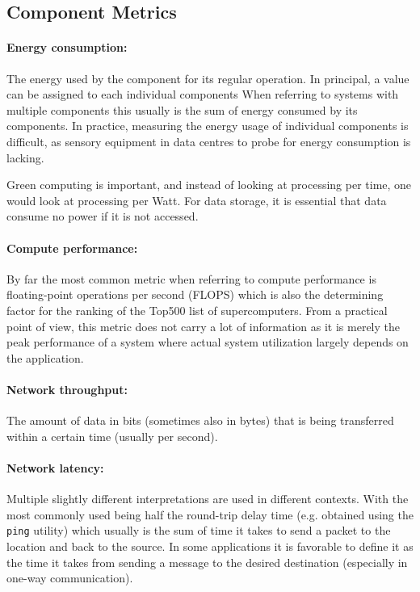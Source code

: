 \subsection{Component Metrics}



\paragraph{Energy consumption:}
The energy used by the component for its regular operation.
In principal, a value can be assigned to each individual components
When referring to systems with multiple components this usually is the sum of energy consumed by its components.
In practice, measuring the energy usage of individual components is difficult, as sensory equipment in data centres to probe for energy consumption is lacking.

Green computing is important, and instead of looking at processing per time, one would look at processing per
Watt.  For data storage, it is essential that data consume no power if it is not accessed. %

\paragraph{Compute performance:}
By far the most common metric when referring to compute performance is floating-point operations per second (FLOPS) which is also the determining factor for the ranking of the Top500 list of supercomputers.
From a practical point of view, this metric does not carry a lot of information as it is merely the peak performance of a system where actual system utilization largely depends on the application.


\paragraph{Network throughput:} The amount of data in bits (sometimes also in bytes) that is being transferred within
a certain time (usually per second).


\paragraph{Network latency:}
Multiple slightly different interpretations are used in different contexts.
With the most commonly used being half the round-trip delay time (e.g. obtained using the \texttt{ping} utility) which usually is the sum of time it takes to send a packet to the location and back to the source.
In some applications it is favorable to define it as the time it takes from sending a message to the desired destination (especially in one-way communication).


